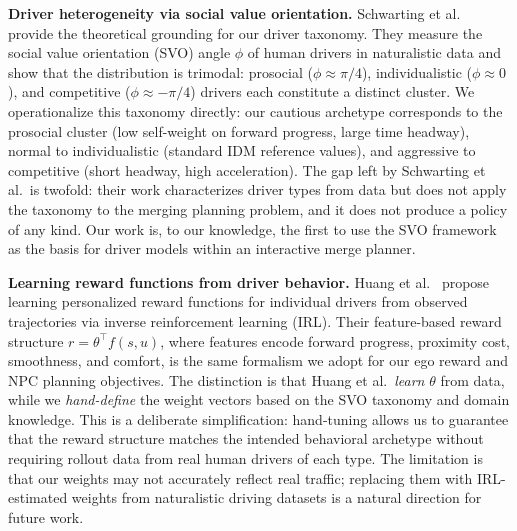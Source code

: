 \documentclass[conference]{IEEEtran}
\begin{document}
\textbf{Driver heterogeneity via social value orientation.}
Schwarting et al.\ \cite{schwarting2019social} provide the theoretical
grounding for our driver taxonomy.
They measure the social value orientation (SVO) angle $\phi$ of human
drivers in naturalistic data and show that the distribution is trimodal:
prosocial ($\phi \approx \pi/4$), individualistic ($\phi \approx 0$), and
competitive ($\phi \approx -\pi/4$) drivers each constitute a distinct
cluster.
We operationalize this taxonomy directly: our cautious archetype corresponds
to the prosocial cluster (low self-weight on forward progress, large time
headway), normal to individualistic (standard IDM reference values), and
aggressive to competitive (short headway, high acceleration).
The gap left by Schwarting et al.\ is twofold: their work characterizes
driver types from data but does not apply the taxonomy to the merging
planning problem, and it does not produce a policy of any kind.
Our work is, to our knowledge, the first to use the SVO framework as the
basis for driver models within an interactive merge planner.

\textbf{Learning reward functions from driver behavior.}
Huang et al.\ \cite{huang2021personalized} propose learning personalized
reward functions for individual drivers from observed trajectories via
inverse reinforcement learning (IRL).
Their feature-based reward structure $r = \theta^\top f(s, u)$, where
features encode forward progress, proximity cost, smoothness, and comfort,
is the same formalism we adopt for our ego reward and NPC planning
objectives.
The distinction is that Huang et al.\ \emph{learn} $\theta$ from data,
while we \emph{hand-define} the weight vectors based on the SVO taxonomy
and domain knowledge.
This is a deliberate simplification: hand-tuning allows us to guarantee
that the reward structure matches the intended behavioral archetype without
requiring rollout data from real human drivers of each type.
The limitation is that our weights may not accurately reflect real traffic;
replacing them with IRL-estimated weights from naturalistic driving datasets
is a natural direction for future work.
\end{document}
